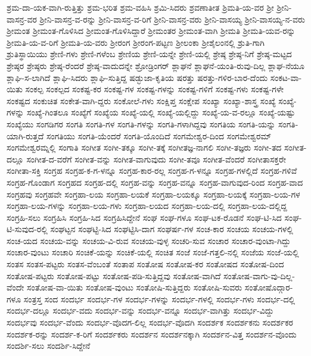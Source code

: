 {ಶ್ರಮ-ದಾ-ಯಕ-ವಾಗಿ-ರುತ್ತಿತ್ತು
ಶ್ರಮ-ಭರಿತ
ಶ್ರಮ-ವಹಿಸಿ
ಶ್ರಮಿ-ಸಿದರು
ಶ್ರವಣಾತೀತ
ಶ್ರಿಮತಿ-ಯ-ವರ
ಶ್ರೀ
ಶ್ರೀನಿ-ವಾಸನ್ರ-ವರ
ಶ್ರೀನಿ-ವಾಸನ್ರ-ವ-ರನ್ನು
ಶ್ರೀನಿ-ವಾಸನ್ರ-ವ-ರಿಗೆ
ಶ್ರೀನಿ-ವಾಸನ್ರ-ವರು
ಶ್ರೀನಿ-ವಾಸಯ್ಯ
ಶ್ರೀನಿ-ವಾಸಯ್ಯ-ನ-ವರು
ಶ್ರೀಮಂತ
ಶ್ರೀಮಂತ-ಗೊಳಿಸಿದ
ಶ್ರೀಮಂತ-ಗೊಳಿಸಿದ್ದಾರೆ
ಶ್ರೀಮಂತರ
ಶ್ರೀಮಂತ-ವಾಗಿ
ಶ್ರೀಮತಿ
ಶ್ರೀಮತಿ-ಯವ-ರನ್ನು
ಶ್ರೀಮತಿ-ಯ-ವ-ರಿಗೆ
ಶ್ರೀಮತಿ-ಯ-ವರು
ಶ್ರೀರಂಗ
ಶ್ರೀರಂಗ-ಪಟ್ಟಣ
ಶ್ರೀಲಂಕಾ
ಶ್ರೀಶೈಲಂನಲ್ಲಿ
ಶ್ರುತಿ-ಗಾಗಿ
ಶ್ರುತಿಸ್ಥಾಯಿಯು
ಶ್ರೇಣಿ-ಗಳು
ಶ್ರೇಣಿ-ಗಳೆಂಬ
ಶ್ರೇಣಿಯ
ಶ್ರೇಣಿ-ಯನ್ನೇ
ಶ್ರೇಣಿ-ಯಲ್ಲಿ
ಶ್ರೇಷ್ಠ
ಶ್ರೇಷ್ಠ-ನಿಗೆ
ಶ್ರೇಷ್ಠ-ಮಟ್ಟದ
ಶ್ರೇಷ್ಠರ
ಶ್ರೇಷ್ಠರು
ಶ್ರೇಷ್ಠ-ರೆಂದರೆ
ಶ್ರೇಷ್ಠ-ವಾದುದನ್ನೇ
ಶ್ರೋಡ್ರಿಂಗರ್
ಶ್ಲಾಘನೆ
ಶ್ಲಾಘನೆ-ಯಂತಿ-ರುವು-ದಿಲ್ಲ
ಶ್ಲಾಘ-ನೆಯೂ
ಶ್ಲಾಘಿ-ಸ-ಲಾಗಿದೆ
ಶ್ಲಾಘಿ-ಸಿದರು
ಶ್ಲಾಘಿ-ಸುತ್ತಿದ್ದ
ಷಡ್ಭುಜಾ-ಕೃತಿಯ
ಷರತ್ತು
ಷರತ್ತು-ಗಳಿರ-ಬಾರ-ದೆಂದು
ಸಂಕಟ-ವಾ-ಯಿತು
ಸಂಕಲ್ಪ
ಸಂಕಲ್ಪದ
ಸಂಕಷ್ಟ-ಕರ
ಸಂಕಷ್ಟ-ಗಳ
ಸಂಕಷ್ಟ-ಗಳನ್ನು
ಸಂಕಷ್ಟ-ಗಳಿಗೆ
ಸಂಕಷ್ಟ-ಗಳು
ಸಂಕಷ್ಟ-ಗಳೇ
ಸಂಕಷ್ಟದ
ಸಂಕುಚಿತ
ಸಂಕೇತ-ವಾಗಿ-ದ್ದರು
ಸಂಕೋಲೆ-ಗಳು
ಸಂಕ್ಷಿಪ್ತ
ಸಂಕ್ಷೇಪ
ಸಂಖ್ಯಾ
ಸಂಖ್ಯಾ-ಶಾಸ್ತ್ರ
ಸಂಖ್ಯೆ
ಸಂಖ್ಯೆ-ಗಳನ್ನು
ಸಂಖ್ಯೆ-ಗಿಂತಲೂ
ಸಂಖ್ಯೆಗೆ
ಸಂಖ್ಯೆಯ
ಸಂಖ್ಯೆ-ಯಲ್ಲಿ
ಸಂಖ್ಯೆ-ಯಲ್ಲಿದ್ದು
ಸಂಖ್ಯೆ-ಯ-ವ-ರಲ್ಲೂ
ಸಂಖ್ಯೆ-ಯಷ್ಟು
ಸಂಖ್ಯೆಯು
ಸಂಗಡಿಗರ
ಸಂಗತಿ
ಸಂಗತಿ-ಗಳ
ಸಂಗತಿ-ಗಳನ್ನು
ಸಂಗತಿ-ಗಳಾಗಿದ್ದವು
ಸಂಗತಿಯ
ಸಂಗತಿ-ಯನ್ನು
ಸಂಗತಿ-ಯಾಗಿ-ರುತ್ತದೆ
ಸಂಗತಿಯು
ಸಂಗತಿ-ಯೆಂದರೆ
ಸಂಗತಿ-ಯೊಂದಿದೆ
ಸಂಗಮೇಶ್ವರ-ದಿಂದ
ಸಂಗಮೇಶ್ವರಮ್
ಸಂಗಮೇಶ್ವರಮ್ನಲ್ಲಿ
ಸಂಗಾತಿ
ಸಂಗೀತ
ಸಂಗೀ-ತಕ್ಕೂ
ಸಂಗೀ-ತಕ್ಕೆ
ಸಂಗೀತಜ್ಞ-ನಾಗಲಿ
ಸಂಗೀ-ತಜ್ಞರು
ಸಂಗೀ-ತದ
ಸಂಗೀತ-ದಲ್ಲೂ
ಸಂಗೀತ-ದ-ವರೆಗೆ
ಸಂಗೀತ-ವನ್ನು
ಸಂಗೀತ-ವಾಗುವುದು
ಸಂಗೀ-ತವೂ
ಸಂಗೀತ-ವೆಂದರೆ
ಸಂಗೀತಾಸಕ್ತರೇ
ಸಂಗೀತಾ-ಸಕ್ತಿ
ಸಂಗ್ರಹ
ಸಂಗ್ರಹ-ಕ-ಗ-ಳನ್ನೂ
ಸಂಗ್ರಹ-ಕಾರ-ರಲ್ಲ
ಸಂಗ್ರಹ-ಗ-ಳನ್ನೂ
ಸಂಗ್ರಹ-ಗಳಲ್ಲಿದೆ
ಸಂಗ್ರಹ-ಗಳಿವೆ
ಸಂಗ್ರಹ-ಗೊಂಡಾಗ
ಸಂಗ್ರಹದ
ಸಂಗ್ರಹ-ದಲ್ಲಿ
ಸಂಗ್ರಹ-ವನ್ನು
ಸಂಗ್ರಹ-ವನ್ನೂ
ಸಂಗ್ರಹ-ವಾಗುವುದ-ರಿಂದ
ಸಂಗ್ರಹ-ವಾದ
ಸಂಗ್ರಹವು
ಸಂಗ್ರಹವೇ
ಸಂಗ್ರಹಾ-ಲಯ
ಸಂಗ್ರಹಾ-ಲಯಕೆ
ಸಂಗ್ರಹಾ-ಲಯಕ್ಕೂ
ಸಂಗ್ರಹಾ-ಲಯಕ್ಕೆ
ಸಂಗ್ರಹಾ-ಲಯ-ಗಳ
ಸಂಗ್ರಹಾ-ಲಯ-ಗಳನ್ನು
ಸಂಗ್ರಹಾ-ಲಯ-ಗಳು
ಸಂಗ್ರಹಾ-ಲಯದ
ಸಂಗ್ರಹಾ-ಲಯ-ದಲ್ಲಿ
ಸಂಗ್ರಹಾ-ಲಯ-ದಲ್ಲಿದ್ದ
ಸಂಗ್ರಹಿ-ಸಲು
ಸಂಗ್ರಹಿಸಿ
ಸಂಗ್ರಹಿ-ಸಿದ
ಸಂಗ್ರಹಿಸಿದ್ದೇನೆ
ಸಂಘ
ಸಂಘ-ಗಳೂ
ಸಂಘ-ಟಕ-ರೊಡನೆ
ಸಂಘ-ಟಿ-ಸಿದ
ಸಂಘ-ಟಿ-ಸುವುದ-ರಲ್ಲಿ
ಸಂಘಟ್ಟನ
ಸಂಘಟ್ಟಿ-ಸಿದ
ಸಂಘಟ್ಟಿಸಿ-ದಾಗ
ಸಂಘರ್ಷ-ಗಳ
ಸಂಚ-ಕಾರ
ಸಂಚಯ
ಸಂಚಯ-ಗಳಲ್ಲಿ
ಸಂಚ-ಯದ
ಸಂಚಯ-ವನ್ನು
ಸಂಚಯ-ವಿ-ರುವ
ಸಂಚಯ-ವುಳ್ಳ
ಸಂಚರಿ-ಸುವ
ಸಂಚಾರ
ಸಂಚಾರ-ವುಂಟಾ-ಗಿದ್ದು
ಸಂಚಾರ-ವುಂಟು
ಸಂಚಾರಿ
ಸಂಚಿಕೆ-ಯನ್ನು
ಸಂಚಿಕೆ-ಯಲ್ಲಿ
ಸಂಚಿತ
ಸಂಜೆ
ಸಂಜೆ-ಗತ್ತಲಿ-ನಲ್ಲಿ
ಸಂಜೆಯ
ಸಂಜೆ-ಯಲ್ಲಿ
ಸಂತಸ
ಸಂತಸ-ಪಟ್ಟರು
ಸಂತಸ-ವೆಂಬಂತೆ
ಸಂತಾಪ
ಸಂತೋಷ
ಸಂತೋಷ-ಕರ
ಸಂತೋಷದ
ಸಂತೋಷ-ದಿಂದ
ಸಂತೋಷ-ಪಟ್ಟರು
ಸಂತೋಷ-ಪಟ್ಟು
ಸಂತೋಷ-ಪಡಿ-ಸುತ್ತಿದ್ದವು
ಸಂತೋಷ-ವಾಗಿದೆ
ಸಂತೋಷ-ವಾಗು-ವು-ದಿಲ್ಲ-ವೆಂದೇ
ಸಂತೋಷ-ವಾ-ಯಿತು
ಸಂತೋಷ-ವುಂಟು
ಸಂತೋಷಿ-ಸುತ್ತಿದ್ದರು
ಸಂತೋಷಿ-ಸುವರು
ಸಂತೋಷೊದ್ಗಾರ-ಗಳೂ
ಸಂತ್ರಸ್ತ
ಸಂದ
ಸಂದರ್ಭ
ಸಂದರ್ಭ-ಗಳ
ಸಂದರ್ಭ-ಗಳನ್ನು
ಸಂದರ್ಭ-ಗಳಲ್ಲಿ
ಸಂದರ್ಭ-ಗಳು
ಸಂದರ್ಭ-ದಲ್ಲಿ
ಸಂದರ್ಭ-ದಲ್ಲೂ
ಸಂದರ್ಭ-ವದು
ಸಂದರ್ಭ-ವನ್ನು
ಸಂದರ್ಭ-ವನ್ನೂ
ಸಂದರ್ಭ-ವಾಗಿತ್ತು
ಸಂದರ್ಭ-ವಿದ್ದು
ಸಂದರ್ಭವು
ಸಂದರ್ಭ-ವೆಂದು
ಸಂದರ್ಭ-ವೊದಗ-ಲಿಲ್ಲ
ಸಂದರ್ಭ-ವೊದಗಿ
ಸಂದರ್ಶಕ
ಸಂದರ್ಶಕನು
ಸಂದರ್ಶಕರ
ಸಂದರ್ಶಕ-ರನ್ನು
ಸಂದರ್ಶ-ಕ-ರಿಗೆ
ಸಂದರ್ಶಕರು
ಸಂದರ್ಶನ
ಸಂದರ್ಶನಕ್ಕಾಗಿ
ಸಂದರ್ಶನ-ವಿತ್ತ
ಸಂದರ್ಶನ-ವೊಂದು
ಸಂದರ್ಶಿ-ಸಲು
ಸಂದರ್ಶಿ-ಸಿದ್ದೇನೆ
}
